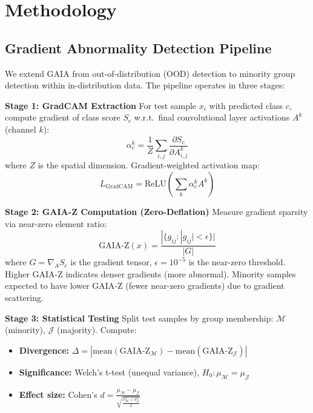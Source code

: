 \section{Methodology}

\subsection{Gradient Abnormality Detection Pipeline}

We extend GAIA \cite{chen2023exploring} from out-of-distribution (OOD) detection to minority group detection within in-distribution data. The pipeline operates in three stages:

\textbf{Stage 1: GradCAM Extraction}
For test sample $x_i$ with predicted class $c$, compute gradient of class score $S_c$ w.r.t.~final convolutional layer activations $A^k$ (channel $k$):
\begin{equation}
\alpha_c^k = \frac{1}{Z} \sum_{i,j} \frac{\partial S_c}{\partial A_{i,j}^k}
\end{equation}
where $Z$ is the spatial dimension. Gradient-weighted activation map:
\begin{equation}
L_{\text{GradCAM}} = \text{ReLU}\left(\sum_k \alpha_c^k A^k\right)
\end{equation}

\textbf{Stage 2: GAIA-Z Computation (Zero-Deflation)}
Measure gradient sparsity via near-zero element ratio:
\begin{equation}
\text{GAIA-Z}(x) = \frac{|\{g_{ij} : |g_{ij}| < \epsilon\}|}{|G|}
\end{equation}
where $G = \nabla_A S_c$ is the gradient tensor, $\epsilon = 10^{-5}$ is the near-zero threshold. Higher GAIA-Z indicates denser gradients (more abnormal). Minority samples expected to have lower GAIA-Z (fewer near-zero gradients) due to gradient scattering.

\textbf{Stage 3: Statistical Testing}
Split test samples by group membership: $\mathcal{M}$ (minority), $\mathcal{J}$ (majority). Compute:
\begin{itemize}
\item \textbf{Divergence:} $\Delta = |\text{mean}(\text{GAIA-Z}_\mathcal{M}) - \text{mean}(\text{GAIA-Z}_\mathcal{J})|$
\item \textbf{Significance:} Welch's t-test (unequal variance), $H_0: \mu_\mathcal{M} = \mu_\mathcal{J}$
\item \textbf{Effect size:} Cohen's $d = \frac{\mu_\mathcal{M} - \mu_\mathcal{J}}{\sqrt{\frac{\sigma_\mathcal{M}^2 + \sigma_\mathcal{J}^2}{2}}}$
\end{itemize}

